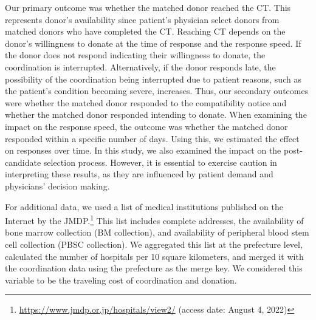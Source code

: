 \documentclass[12pt, a4paper]{article}
\begin{document}
Our primary outcome was whether the matched donor reached the CT. This represents donor's availability since patient's physician select donors from matched donors who have completed the CT. Reaching CT depends on the donor's willingness to donate at the time of response and the response speed. If the donor does not respond indicating their willingness to donate, the coordination is interrupted. Alternatively, if the donor responds late, the possibility of the coordination being interrupted due to patient reasons, such as the patient's condition becoming severe, increases. Thus, our secondary outcomes were whether the matched donor responded to the compatibility notice and whether the matched donor responded intending to donate. When examining the impact on the response speed, the outcome was whether the matched donor responded within a specific number of days. Using this, we estimated the effect on responses over time. In this study, we also examined the impact on the post-candidate selection process. However, it is essential to exercise caution in interpreting these results, as they are influenced by patient demand and physicians' decision making.

For additional data, we used a list of medical institutions published on the Internet by the JMDP.\footnote{\url{https://www.jmdp.or.jp/hospitals/view2/} (access date: August 4, 2022)} This list includes complete addresses, the availability of bone marrow collection (BM collection), and availability of peripheral blood stem cell collection (PBSC collection). We aggregated this list at the prefecture level, calculated the number of hospitals per 10 square kilometers, and merged it with the coordination data using the prefecture as the merge key. We considered this variable to be the traveling cost of coordination and donation.
\end{document}
